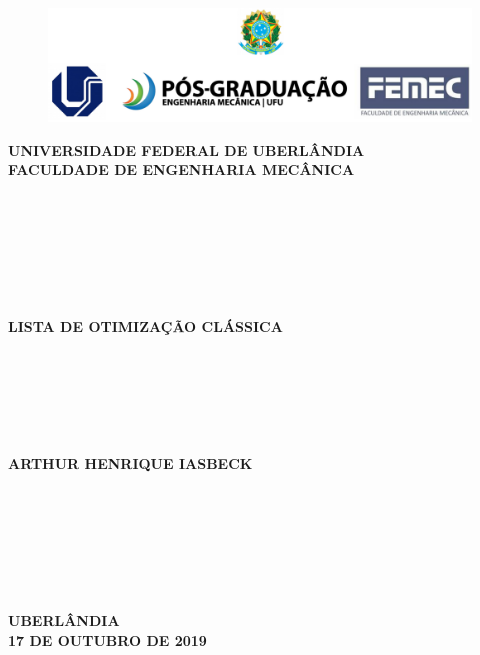 \documentclass[12pt]{article}
\begin{document}
	\singlespacing %
	
	\thispagestyle{empty}
	
	\begin{figure}[H]
		\centering
		\includegraphics[width=\linewidth]{cabecalho.png}
	\end{figure}
	
	\begin{center}
		\large
		\textbf{UNIVERSIDADE FEDERAL DE UBERLÂNDIA} \\ \vspace{0.3cm}
		\textbf{FACULDADE DE ENGENHARIA MECÂNICA} \\~\\~\\~\\~\\~\\~\\~\\
		\Large
		\textbf{LISTA DE OTIMIZAÇÃO CLÁSSICA} \\~\\~\\~\\~\\~\\~\\
		\large
		\textbf{ARTHUR HENRIQUE IASBECK} \\~\\~\\~\\~\\~\\~\\~\\
		\large
		\textbf{UBERLÂNDIA} \\
		\textbf{17 DE OUTUBRO DE 2019}
	\end{center}
	\newpage
	\restoregeometry
	
	\setcounter{page}{1} %
	
	
\end{document}
